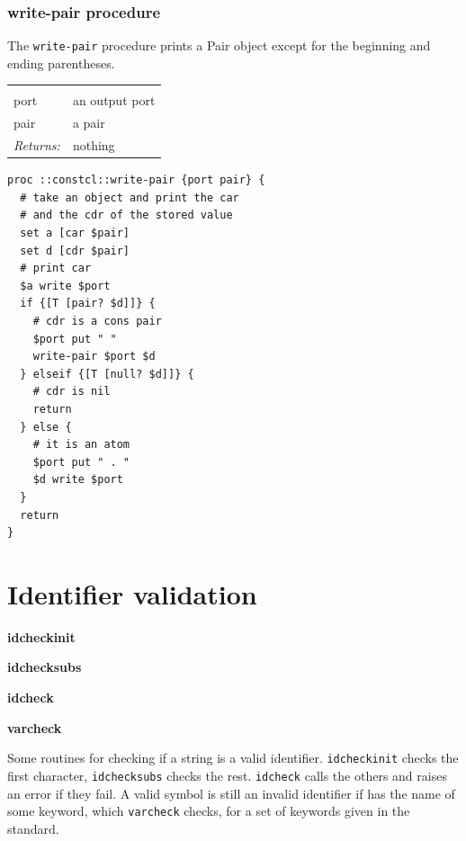 \documentclass[twoside,9pt]{report}
\begin{document}
\subsection{write-pair procedure}
\label{write-pair-procedure}


The \texttt{write-pair} procedure prints a Pair object except for the beginning and ending parentheses.

\noindent\begin{tabular}{ |p{1.9cm} p{8cm}| }
\hline
\rowcolor[HTML]{CCCCCC} \multicolumn{2}{|l|}{\bf write-pair (internal)} \\
port & an output port \\
pair & a pair \\
\textit{Returns:} & nothing \\
\hline
\end{tabular}
\begin{lstlisting}
proc ::constcl::write-pair {port pair} {
  # take an object and print the car
  # and the cdr of the stored value
  set a [car $pair]
  set d [cdr $pair]
  # print car
  $a write $port
  if {[T [pair? $d]]} {
    # cdr is a cons pair
    $port put " "
    write-pair $port $d
  } elseif {[T [null? $d]]} {
    # cdr is nil
    return
  } else {
    # it is an atom
    $port put " . "
    $d write $port
  }
  return
}
\end{lstlisting}
\chapter{Identifier validation}
\label{identifier-validation}


\textbf{idcheckinit}


\textbf{idchecksubs}


\textbf{idcheck}


\textbf{varcheck}


Some routines for checking if a string is a valid identifier. \texttt{idcheckinit} checks the first character, \texttt{idchecksubs} checks the rest. \texttt{idcheck} calls the others and raises an error if they fail. A valid symbol is still an invalid identifier if has the name of some keyword, which \texttt{varcheck} checks, for a set of keywords given in the standard.
\end{document}

